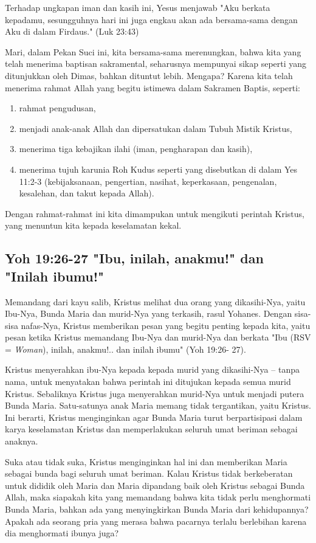 Terhadap ungkapan iman dan kasih ini,
Yesus menjawab "Aku berkata kepadamu, sesungguhnya hari ini juga engkau akan
ada bersama-sama dengan Aku di dalam Firdaus." (Luk 23:43)

Mari, dalam Pekan Suci ini, kita bersama-sama merenungkan, bahwa kita yang
telah menerima baptisan sakramental, seharusnya mempunyai sikap seperti yang
ditunjukkan oleh Dimas, bahkan dituntut lebih. Mengapa? Karena kita telah
menerima rahmat Allah yang begitu istimewa dalam Sakramen Baptis, seperti: 
\begin{enumerate}[label=(\alph{enumi})]
\item rahmat pengudusan, 
\item menjadi anak-anak Allah dan dipersatukan dalam Tubuh
Mistik Kristus, 
\item menerima tiga kebajikan ilahi (iman, pengharapan dan
kasih), 
\item menerima tujuh karunia Roh Kudus seperti yang disebutkan di dalam
Yes 11:2-3 (kebijaksanaan, pengertian, nasihat, keperkasaan, pengenalan,
kesalehan, dan takut kepada Allah). 
\end{enumerate}

Dengan rahmat-rahmat ini kita dimampukan
untuk mengikuti perintah Kristus, yang menuntun kita kepada keselamatan kekal.

\subsection{Yoh 19:26-27 "Ibu, inilah, anakmu!" dan "Inilah ibumu!"}
Memandang dari kayu salib, Kristus melihat dua orang
yang dikasihi-Nya, yaitu Ibu-Nya, Bunda Maria dan murid-Nya yang terkasih,
rasul Yohanes. Dengan sisa-sisa nafas-Nya, Kristus memberikan pesan yang begitu
penting kepada kita, yaitu pesan ketika Kristus memandang Ibu-Nya dan murid-Nya
dan berkata "Ibu (RSV = \textit{Woman}), inilah, anakmu!.. dan inilah ibumu" (Yoh 19:26-
27). 

Kristus menyerahkan ibu-Nya kepada  kepada murid yang
dikasihi-Nya – tanpa nama, untuk menyatakan bahwa perintah ini ditujukan kepada
semua murid Kristus.
Sebaliknya Kristus juga menyerahkan murid-Nya untuk menjadi putera Bunda Maria.
Satu-satunya anak Maria memang tidak tergantikan, yaitu Kristus. Ini
berarti, Kristus menginginkan agar Bunda Maria turut berpartisipasi dalam karya
keselamatan Kristus dan memperlakukan seluruh umat beriman sebagai anaknya.

Suka atau tidak suka, Kristus menginginkan hal ini dan memberikan Maria sebagai
bunda bagi seluruh umat beriman. Kalau Kristus tidak berkeberatan untuk dididik
oleh Maria dan Maria dipandang baik oleh Kristus sebagai Bunda Allah, maka
siapakah kita yang memandang bahwa kita tidak perlu menghormati Bunda Maria,
bahkan ada yang menyingkirkan Bunda Maria dari kehidupannya? Apakah ada seorang
pria yang merasa bahwa pacarnya terlalu berlebihan karena dia menghormati
ibunya juga?

